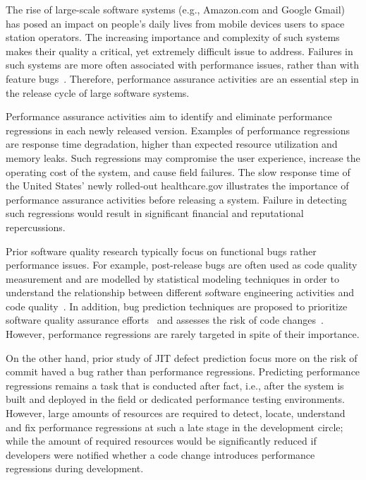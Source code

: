 
The rise of large-scale software systems (e.g., Amazon.com and Google Gmail) has posed an impact on people's daily lives from mobile devices users to space station operators. The increasing importance and complexity of such systems makes their quality a critical, yet extremely difficult issue to address. Failures in such systems are more often associated with performance issues, rather than with feature bugs~\cite{Weyuker:2000}. Therefore, performance assurance activities are an essential step in the release cycle of large software systems. 

Performance assurance activities aim to identify and eliminate performance regressions in each newly released version. Examples of performance regressions are response time degradation, higher than expected resource utilization and memory leaks. Such regressions may compromise the user experience, increase the operating cost of the system, and cause field failures. The slow response time of the United States' newly rolled-out healthcare.gov illustrates the importance of performance assurance activities before releasing a system. Failure in detecting such regressions would result in significant financial and reputational repercussions.

Prior software quality research typically focus on functional bugs rather performance issues. For example, post-release bugs are often used as code quality measurement and are modelled by statistical modeling techniques in order to understand the relationship between different software engineering activities and code quality~\cite{Hassan:2009:PFU}. In addition, bug prediction techniques are proposed to prioritize software quality assurance efforts~\cite{Zimmermann:2007:PDE,Nagappan:2005:URC,Nagappan:2006:MMP} and assesses the risk of code changes~\cite{emadjit}. However, performance regressions are rarely targeted in spite of their importance.

On the other hand, prior study of JIT defect prediction focus more on the risk of commit haved a bug rather than performance regressions. Predicting performance regressions remains a task that is conducted after fact, i.e., after the system is built and deployed in the field or dedicated performance testing environments. However, large amounts of resources are required to detect, locate, understand and fix performance regressions at such a late stage in the development circle; while the amount of required resources would be significantly reduced if developers were notified whether a code change introduces performance regressions during development. 

